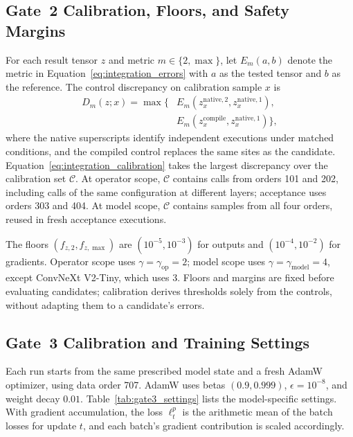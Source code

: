 \subsection{Gate~2 Calibration, Floors, and Safety Margins}
\label{app:gate2_thresholds}
For each result tensor $z$ and metric $m\in\{2,\max\}$, let $E_m(a,b)$ denote the metric in Equation~\ref{eq:integration_errors} with $a$ as the tested tensor and $b$ as the reference. The control discrepancy on calibration sample $x$ is
\begin{equation}
\begin{aligned}
D_m(z;x)=\max\bigl\{&
E_m\!\left(z_x^{\mathrm{native},2},z_x^{\mathrm{native},1}\right),\\
& E_m\!\left(z_x^{\mathrm{compile}},z_x^{\mathrm{native},1}\right)
\bigr\},
\end{aligned}
\label{eq:integration_control_error}
\end{equation}
where the native superscripts identify independent executions under matched conditions, and the compiled control replaces the same sites as the candidate. Equation~\ref{eq:integration_calibration} takes the largest discrepancy over the calibration set $\mathcal{C}$. At operator scope, $\mathcal{C}$ contains calls from orders 101 and 202, including calls of the same configuration at different layers; acceptance uses orders 303 and 404. At model scope, $\mathcal{C}$ contains samples from all four orders, reused in fresh acceptance executions.

The floors $(f_{z,2},f_{z,\max})$ are $(10^{-5},10^{-3})$ for outputs and $(10^{-4},10^{-2})$ for gradients. Operator scope uses $\gamma=\gamma_{\mathrm{op}}=2$; model scope uses $\gamma=\gamma_{\mathrm{model}}=4$, except ConvNeXt V2-Tiny, which uses 3. Floors and margins are fixed before evaluating candidates; calibration derives thresholds solely from the controls, without adapting them to a candidate's errors.

\subsection{Gate~3 Calibration and Training Settings}
\label{app:gate3_settings}
Each run starts from the same prescribed model state and a fresh AdamW optimizer, using data order 707. AdamW uses betas $(0.9,0.999)$, $\epsilon=10^{-8}$, and weight decay $0.01$. Table~\ref{tab:gate3_settings} lists the model-specific settings. With gradient accumulation, the loss $\ell_t^p$ is the arithmetic mean of the batch losses for update $t$, and each batch's gradient contribution is scaled accordingly.


